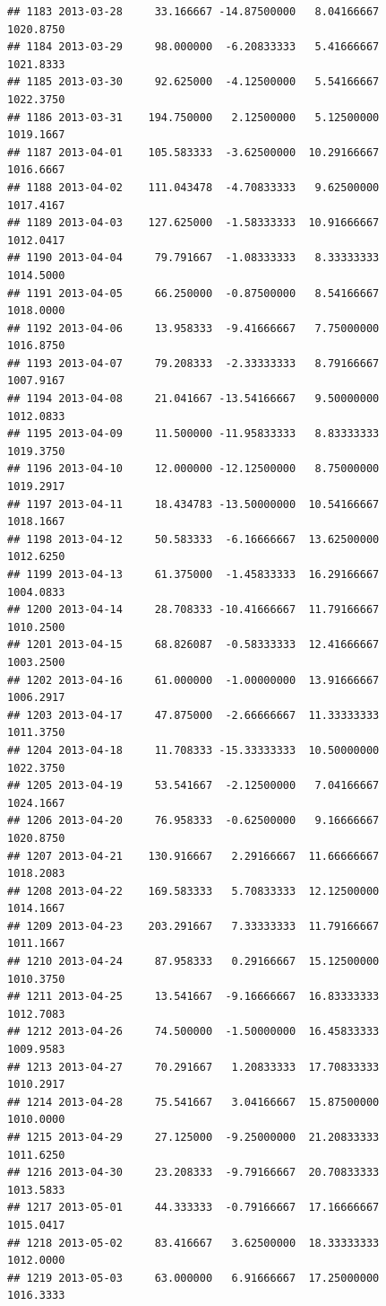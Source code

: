 \documentclass[
]{article}
\begin{document}
\begin{verbatim}
## 1183 2013-03-28     33.166667 -14.87500000   8.04166667    1020.8750
## 1184 2013-03-29     98.000000  -6.20833333   5.41666667    1021.8333
## 1185 2013-03-30     92.625000  -4.12500000   5.54166667    1022.3750
## 1186 2013-03-31    194.750000   2.12500000   5.12500000    1019.1667
## 1187 2013-04-01    105.583333  -3.62500000  10.29166667    1016.6667
## 1188 2013-04-02    111.043478  -4.70833333   9.62500000    1017.4167
## 1189 2013-04-03    127.625000  -1.58333333  10.91666667    1012.0417
## 1190 2013-04-04     79.791667  -1.08333333   8.33333333    1014.5000
## 1191 2013-04-05     66.250000  -0.87500000   8.54166667    1018.0000
## 1192 2013-04-06     13.958333  -9.41666667   7.75000000    1016.8750
## 1193 2013-04-07     79.208333  -2.33333333   8.79166667    1007.9167
## 1194 2013-04-08     21.041667 -13.54166667   9.50000000    1012.0833
## 1195 2013-04-09     11.500000 -11.95833333   8.83333333    1019.3750
## 1196 2013-04-10     12.000000 -12.12500000   8.75000000    1019.2917
## 1197 2013-04-11     18.434783 -13.50000000  10.54166667    1018.1667
## 1198 2013-04-12     50.583333  -6.16666667  13.62500000    1012.6250
## 1199 2013-04-13     61.375000  -1.45833333  16.29166667    1004.0833
## 1200 2013-04-14     28.708333 -10.41666667  11.79166667    1010.2500
## 1201 2013-04-15     68.826087  -0.58333333  12.41666667    1003.2500
## 1202 2013-04-16     61.000000  -1.00000000  13.91666667    1006.2917
## 1203 2013-04-17     47.875000  -2.66666667  11.33333333    1011.3750
## 1204 2013-04-18     11.708333 -15.33333333  10.50000000    1022.3750
## 1205 2013-04-19     53.541667  -2.12500000   7.04166667    1024.1667
## 1206 2013-04-20     76.958333  -0.62500000   9.16666667    1020.8750
## 1207 2013-04-21    130.916667   2.29166667  11.66666667    1018.2083
## 1208 2013-04-22    169.583333   5.70833333  12.12500000    1014.1667
## 1209 2013-04-23    203.291667   7.33333333  11.79166667    1011.1667
## 1210 2013-04-24     87.958333   0.29166667  15.12500000    1010.3750
## 1211 2013-04-25     13.541667  -9.16666667  16.83333333    1012.7083
## 1212 2013-04-26     74.500000  -1.50000000  16.45833333    1009.9583
## 1213 2013-04-27     70.291667   1.20833333  17.70833333    1010.2917
## 1214 2013-04-28     75.541667   3.04166667  15.87500000    1010.0000
## 1215 2013-04-29     27.125000  -9.25000000  21.20833333    1011.6250
## 1216 2013-04-30     23.208333  -9.79166667  20.70833333    1013.5833
## 1217 2013-05-01     44.333333  -0.79166667  17.16666667    1015.0417
## 1218 2013-05-02     83.416667   3.62500000  18.33333333    1012.0000
## 1219 2013-05-03     63.000000   6.91666667  17.25000000    1016.3333

\end{verbatim}
\end{document}
